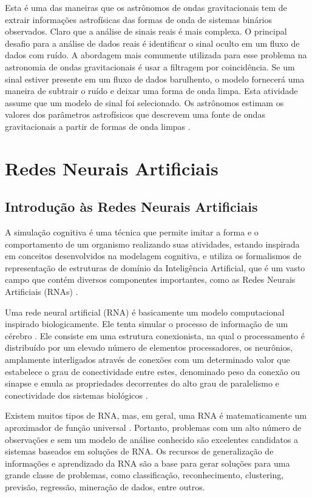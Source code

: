 Esta é uma das maneiras que os astrônomos de ondas gravitacionais tem de extrair informações astrofísicas das formas de onda de sistemas binários observados. Claro que a análise de sinais reais é mais complexa. O principal desafio para a análise de dados reais é identificar o sinal oculto em um fluxo de dados com ruído. A abordagem mais comumente utilizada para esse problema na astronomia de ondas gravitacionais é usar a filtragem por coincidência. Se um sinal estiver presente em um fluxo de dados barulhento, o modelo fornecerá uma maneira de subtrair o ruído e deixar uma forma de onda limpa. Esta atividade assume que um modelo de sinal foi selecionado. Os astrônomos estimam os valores dos parâmetros astrofísicos que descrevem uma fonte de ondas gravitacionais a partir de formas de onda limpas \cite{rubbo2007hands}. 


\section{Redes Neurais Artificiais}
\subsection{Introdução às Redes Neurais Artificiais}

A simulação cognitiva é uma técnica que permite imitar a forma e o comportamento de um organismo realizando suas atividades, estando inspirada em conceitos desenvolvidos na modelagem cognitiva, e utiliza os formalismos de representação de estruturas de domínio da Inteligência Artificial, que é um vasto campo que contém diversos componentes importantes, como as Redes Neurais Artificiais (RNAs) \cite{furtado2019redes}.

Uma rede neural artificial (RNA) é basicamente um modelo computacional inspirado biologicamente. Ele tenta simular o processo de informação de um cérebro \cite{franchini2018artificial,yalccinreconfigurable}. Ele consiste em uma estrutura conexionista, na qual o processamento é distribuído por um elevado número de elementos processadores, os neurônios, amplamente interligados através de conexões com um determinado valor que estabelece o grau de conectividade entre estes, denominado peso da conexão ou sinapse e emula as propriedades decorrentes do alto grau de paralelismo e conectividade dos sistemas biológicos \cite{furtado2019redes}.

Existem muitos tipos de RNA, mas, em geral, uma RNA é matematicamente um aproximador de função universal \cite{Cybenko1989}. Portanto, problemas com um alto número de observações e sem um modelo de análise conhecido são excelentes candidatos a sistemas baseados em soluções de RNA. Os recursos de generalização de informações e aprendizado da RNA são a base para gerar soluções para uma grande classe de problemas, como classificação, reconhecimento, clustering, previsão, regressão, mineração de dados, entre outros.

